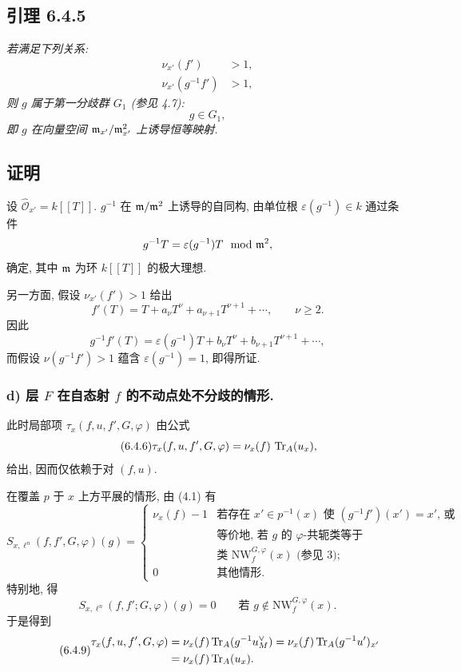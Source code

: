 \subsection*{引理 6.4.5}
\emph{若满足下列关系:}
\begin{align*}
\nu_{x'}(f')&>1,\\
\nu_{x'}(g^{-1}f')&>1,
\end{align*}
\emph{则 $g$ 属于第一分歧群 $G_1$ (参见 4.7):}
\[
g\in G_1,
\]
\emph{即 $g$ 在向量空间 $\mathfrak m_{x'}/\mathfrak m_{x'}^2$ 上诱导恒等映射.}

\subsection*{证明}
设 $\widehat{\mathcal O}_{x'}=k[[T]]$. $g^{-1}$ 在 $\mathfrak m/\mathfrak m^2$ 上诱导的自同构, 由单位根 $\varepsilon(g^{-1})\in k$ 通过条件
\[
g^{-1}T=\varepsilon(g^{-1})T\mod {\mathfrak m}^2,
\]
确定, 其中 $\mathfrak m$ 为环 $k[[T]]$ 的极大理想.

另一方面, 假设 $\nu_{x'}(f')>1$ 给出
\[
f'(T)=T+a_\nu T^\nu+a_{\nu+1}T^{\nu+1}+\cdots,
\qquad \nu\ge2.
\]
因此
\[
g^{-1}f'(T)=\varepsilon(g^{-1})T+b_\nu T^\nu+b_{\nu+1}T^{\nu+1}+\cdots,
\]
而假设 $\nu(g^{-1}f')>1$ 蕴含 $\varepsilon(g^{-1})=1$, 即得所证.

\subsubsection*{d) 层 $F$ 在自态射 $f$ 的不动点处不分歧的情形.}
此时局部项 $\tau_x(f,u,f',G,\varphi)$ 由公式
\begin{equation}\tag{6.4.6}
\tau_x(f,u,f',G,\varphi)=\nu_x(f)\,\operatorname{Tr}_A(u_x),
\end{equation}
给出, 因而仅依赖于对 $(f,u)$.

在覆盖 $p$ 于 $x$ 上方平展的情形, 由 (4.1) 有
\begin{equation}\tag{6.4.7}
S_{x,\ell^n}(f,f',G,\varphi)(g)=
\begin{cases}
\nu_x(f)-1&\text{若存在 }x'\in p^{-1}(x)\text{ 使 }(g^{-1}f')(x')=x'\text{, 或}\\
&\text{等价地, 若 $g$ 的 $\varphi$-共轭类等于}\\
&\text{类 }\mathrm{NW}_{f}^{G,\varphi}(x)\text{ (参见 3); }\\
0&\text{其他情形.}
\end{cases}
\end{equation}
特别地, 得
\begin{equation}\tag{6.4.8}
S_{x,\ell^n}(f,f';G,\varphi)(g)=0
\qquad \text{若 } g\notin \mathrm{NW}_{f}^{G,\varphi}(x).
\end{equation}
于是得到
\begin{equation}\tag{6.4.9}
\begin{aligned}
\tau_x(f,u,f',G,\varphi)
&=\nu_x(f)\operatorname{Tr}_A(g^{-1}u_M^\vee)
=\nu_x(f)\operatorname{Tr}_A(g^{-1}u')_{x'}\\
&=\nu_x(f)\operatorname{Tr}_A(u_x).
\end{aligned}
\end{equation}

